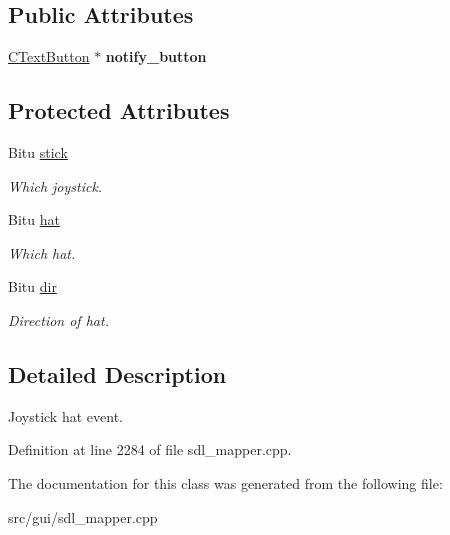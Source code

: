 \subsection*{Public Attributes}
\begin{DoxyCompactItemize}
\item 
\hypertarget{classCJHatEvent_a4d7f2a971b1ecad29e15806dfedfbbf4}{\hyperlink{classCTextButton}{C\-Text\-Button} $\ast$ {\bfseries notify\-\_\-button}}\label{classCJHatEvent_a4d7f2a971b1ecad29e15806dfedfbbf4}

\end{DoxyCompactItemize}
\subsection*{Protected Attributes}
\begin{DoxyCompactItemize}
\item 
\hypertarget{classCJHatEvent_a53d2e407f823a8bd30a2c0d5613cb29b}{Bitu \hyperlink{classCJHatEvent_a53d2e407f823a8bd30a2c0d5613cb29b}{stick}}\label{classCJHatEvent_a53d2e407f823a8bd30a2c0d5613cb29b}

\begin{DoxyCompactList}\small\item\em Which joystick. \end{DoxyCompactList}\item 
\hypertarget{classCJHatEvent_a33cb6a20470c519958c6fd0929bcc7cd}{Bitu \hyperlink{classCJHatEvent_a33cb6a20470c519958c6fd0929bcc7cd}{hat}}\label{classCJHatEvent_a33cb6a20470c519958c6fd0929bcc7cd}

\begin{DoxyCompactList}\small\item\em Which hat. \end{DoxyCompactList}\item 
\hypertarget{classCJHatEvent_a8f7cc4b080b4f6054d6da118209683b7}{Bitu \hyperlink{classCJHatEvent_a8f7cc4b080b4f6054d6da118209683b7}{dir}}\label{classCJHatEvent_a8f7cc4b080b4f6054d6da118209683b7}

\begin{DoxyCompactList}\small\item\em Direction of hat. \end{DoxyCompactList}\end{DoxyCompactItemize}


\subsection{Detailed Description}
Joystick hat event. 

Definition at line 2284 of file sdl\-\_\-mapper.\-cpp.



The documentation for this class was generated from the following file\-:\begin{DoxyCompactItemize}
\item 
src/gui/sdl\-\_\-mapper.\-cpp\end{DoxyCompactItemize}
